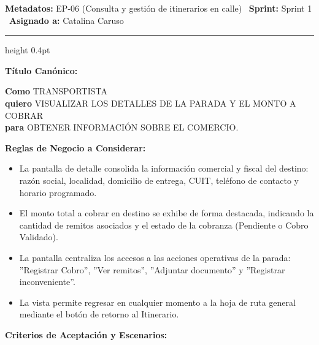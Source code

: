 \documentclass[a4paper,9pt]{article}
\begin{document}
\begin{tcolorbox}[hucard, title={\textbf{HU-67: VISUALIZAR DETALLE DE PARADA Y MONTO A COBRAR} \hfill \scriptsize \colorbox{tealstatus}{\textbf{\ Accepted\ }} \quad \colorbox{white}{\textcolor{primarydark}{\textbf{\ 3 pts\ }}}}]
\vspace{-1pt}
\noindent\textbf{\footnotesize Metadatos:} EP-06 (Consulta y gestión de itinerarios en calle) \textbar\ \textbf{Sprint:} Sprint 1 \textbar\ \textbf{Asignado a:} Catalina Caruso\par\vspace{2pt}
\hrule height 0.4pt\par\vspace{3pt}
\noindent\textbf{\footnotesize Título Canónico:}\par\vspace{1pt}
{\small \textbf{Como} TRANSPORTISTA \\ \textbf{quiero} VISUALIZAR LOS DETALLES DE LA PARADA Y EL MONTO A COBRAR \\ \textbf{para} OBTENER INFORMACIÓN SOBRE EL COMERCIO.}\par\vspace{3pt}
\noindent\textbf{\footnotesize Reglas de Negocio a Considerar:}\par\vspace{1pt}
{\footnotesize
\begin{itemize}[leftmargin=12pt, nosep, itemsep=1.5pt, topsep=1pt]
\item La pantalla de detalle consolida la información comercial y fiscal del destino: razón social, localidad, domicilio de entrega, CUIT, teléfono de contacto y horario programado.
\item El monto total a cobrar en destino se exhibe de forma destacada, indicando la cantidad de remitos asociados y el estado de la cobranza (Pendiente o Cobro Validado).
\item La pantalla centraliza los accesos a las acciones operativas de la parada: ''Registrar Cobro'', ''Ver remitos'', ''Adjuntar documento'' y ''Registrar inconveniente''.
\item La vista permite regresar en cualquier momento a la hoja de ruta general mediante el botón de retorno al Itinerario.
\end{itemize}
}\par\vspace{3pt}
\noindent\textbf{\footnotesize Criterios de Aceptación y Escenarios:}\par\vspace{2pt}

\end{tcolorbox}
\end{document}
